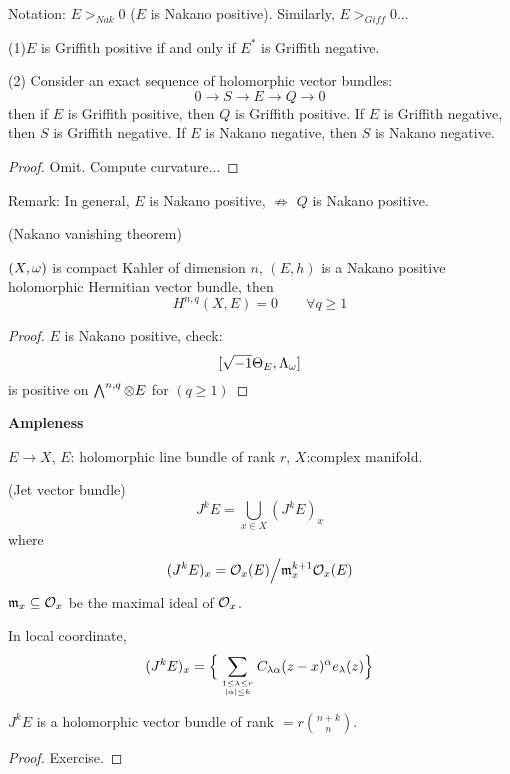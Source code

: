 Notation: $E>_{Nak}0$ ($E$ is Nakano positive).
Similarly, $E>_{Giff}0$...

\begin{prop}

(1)$E$ is Griffith positive if and only if $E^*$ is Griffith negative.

(2) Consider an exact sequence of holomorphic vector bundles:
$$0\to S\to E\to Q\to 0$$
then if $E$ is Griffith positive, then $Q$ is Griffith positive.
If $E$ is Griffith negative, then $S$ is Griffith negative.
If $E$ is Nakano negative, then $S$ is Nakano negative.
\end{prop}

\begin{proof}
Omit. Compute curvature...
\end{proof}

Remark: In general, $E$ is Nakano positive, $\not\Rightarrow$
$Q$ is Nakano positive.

\begin{thm}(Nakano vanishing theorem)

$(X,\omega)$ is compact Kahler of dimension $n$,
$(E,h)$ is a Nakano positive holomorphic Hermitian vector bundle, then
$$H^{n,q}(X,E)=0\qquad \forall q\geq 1$$
\end{thm}

\begin{proof}
$E$ is Nakano positive, check:
$$[\sqrt{-1}\Theta_E,\Lambda_\omega]$$
is positive on $\bigwedge\nolimits^{n,q}\otimes E$ for $(q\geq 1)$
\end{proof}

\textbf{Ampleness}

$E\to X$, $E$: holomorphic line bundle of rank $r$,
$X$:complex manifold.

\begin{definition}(Jet vector bundle)
$$J^kE=\bigcup_{x\in X}(J^kE)_x$$
where
$$(J^kE)_x=\mathcal{O}_x(E)\Big/\mathfrak{m}_x^{k+1}\mathcal{O}_x(E)$$
$\mathfrak{m}_x\subseteq\mathcal{O}_x$ be the maximal ideal of $\mathcal{O}_x$.
\end{definition}

In local coordinate,
$$
  (J^kE)_x
=
  \Big\{
    \sum_{1\leq\lambda\leq r \atop |\alpha|\leq k}
      C_{\lambda\alpha}(z-x)^{\alpha} e_{\lambda}(z)
  \Big\}
$$

\begin{prop}
$J^kE$ is a holomorphic vector bundle of rank $=r{n+k\choose n}$.
\end{prop}

\begin{proof}
  Exercise.
\end{proof}

